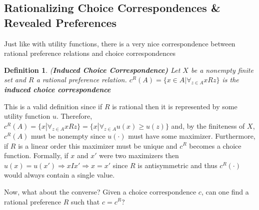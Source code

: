 \documentclass[12pt]{article}
\newtheorem{defin}{Definition}
\newcommand{\tn}[1]{\textnormal{#1}}
\newcommand{\name}[1]{\tn{(\textbf{#1)}}}
\newcommand{\RIGHT}{\Longrightarrow}
\newcommand{\3}{\vspace*{3mm}}
\begin{document}
\subsection{Rationalizing Choice Correspondences \& Revealed Preferences}

Just like with utility functions, there is a very nice correspondence between rational preference relations and choice correspondences 
\begin{defin} \name{Induced Choice Correspondence}
\tn{Let $X$ be a nonempty finite set and $R$ a rational preference relation. $c^R(A)  = \{x \in A | {\forall}_{z \in A} x R z\}$ is the \textbf{induced choice correspondence}}
\end{defin}

This is a valid definition since if $R$ is rational then it is represented by some utility function $u$. Therefore, $c^R(A)  = \{x | {\forall}_{z \in A} x R z\} =  \{x | {\forall}_{z \in A} u(x) \geq u(z)\} $ and, by the finiteness of $X$, $c^R(A)$ must be nonempty since $u(\cdot)$ must have some maximizer. Furthermore, if $R$ is a linear order this maximizer must be unique and $c^R$ becomes a choice function. Formally, if $x$ and $x'$ were two maximizers then $u(x) = u(x') \RIGHT x I x' \RIGHT x = x'$ since $R$ is antisymmetric and thus $c^R(\cdot)$ would always contain a single value. 


Now, what about the converse? Given a choice correspondence $c$, can one find a rational preference $R$ such that $c = c^R$? 
\end{document}
